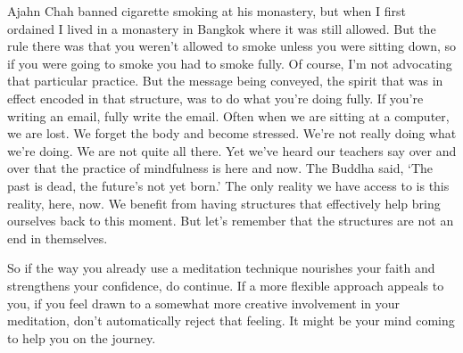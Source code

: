 Ajahn Chah banned cigarette smoking at his monastery, but when I first
ordained I lived in a monastery in Bangkok where it was still allowed.
But the rule there was that you weren’t allowed to smoke unless you were
sitting down, so if you were going to smoke you had to smoke fully. Of
course, I’m not advocating that particular practice. But the message
being conveyed, the spirit that was in effect encoded in that structure,
was to do what you’re doing fully. If you’re writing an email, fully
write the email. Often when we are sitting at a computer, we are lost.
We forget the body and become stressed. We’re not really doing what
we’re doing. We are not quite all there. Yet we’ve heard our teachers
say over and over that the practice of mindfulness is here and now. The
Buddha said, ‘The past is dead, the future’s not yet born.’ The only
reality we have access to is this reality, here, now. We benefit from
having structures that effectively help bring ourselves back to this
moment. But let’s remember that the structures are not an end in
themselves.

So if the way you already use a meditation technique nourishes your
faith and strengthens your confidence, do continue. If a more flexible
approach appeals to you, if you feel drawn to a somewhat more creative
involvement in your meditation, don’t automatically reject that feeling.
It might be your mind coming to help you on the journey.
